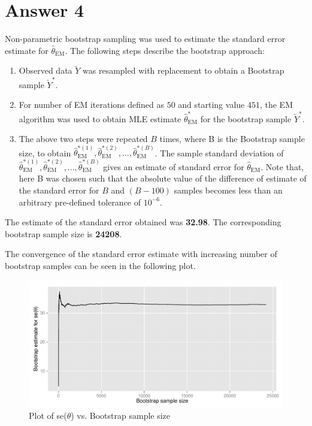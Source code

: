 \documentclass[12pt]{article}
\begin{document}
\section*{Answer 4}
Non-parametric bootstrap sampling was used to estimate the standard error estimate for $\hat{\theta}_{\text{EM}}$. The following steps describe the bootstrap approach:
\begin{enumerate}[label=(\alph*)]
\item Observed data $\utilde{Y}$ was resampled with replacement to obtain a Bootstrap sample $\utilde{Y}^*$.
\item For number of EM iterations defined as $50$ and starting value $451$, the EM algorithm was used to obtain MLE estimate $\hat{\theta}^*_{\text{EM}}$ for the bootstrap sample $\utilde{Y}^*$.

\item The above two steps were repeated $B$ times, where B is the Bootstrap sample size, to obtain $\hat{\theta}^{*(1)}_{\text{EM}}, \hat{\theta}^{*(2)}_{\text{EM}}, ...,  \hat{\theta}^{*(B)}_{\text{EM}}$. The sample standard deviation of $\hat{\theta}^{*(1)}_{\text{EM}}, \hat{\theta}^{*(2)}_{\text{EM}}, ...,  \hat{\theta}^{*(B)}_{\text{EM}}$ gives an estimate of standard error  for $\hat{\theta}_{\text{EM}}$. Note that, here B was chosen such that the absolute value of the difference of estimate of the standard error for $B$ and $(B-100)$ samples becomes less than an arbitrary pre-defined tolerance of $10^{-6}$.

\end{enumerate}

The estimate of the standard error obtained was \textbf{32.98}. The corresponding bootstrap sample size is \textbf{24208}.

The convergence of the standard error estimate with increasing number of bootstrap samples can be seen in the following plot.
\begin{figure}[H]
\begin{centering}
\includegraphics{aua257HW4-004}
\caption{Plot of se($\theta$) vs. Bootstrap sample size}
\end{centering}
\end{figure}
\end{document}
